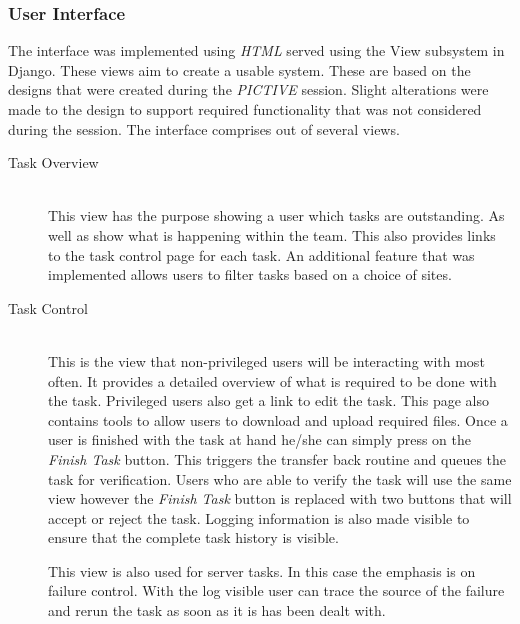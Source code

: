 \documentclass[12pt,a4paper]{report}
\begin{document}
\subsubsection{User Interface}
The interface was implemented using \emph{HTML} served using the View subsystem in Django.
These views aim to create a usable system. These are based on the designs that were created
during the \emph{PICTIVE} session. Slight alterations were made to the design to support required
functionality that was not considered during the session. The interface comprises out of several
views.
\begin{description}
\item[Task Overview] \hfill \\
    This view has the purpose showing a user which tasks are outstanding. As well as show what is
    happening within the team. This also provides links to the task control page for each task.
    An additional feature that was implemented allows users to filter tasks based on a choice
    of sites.
\item[Task Control] \hfill \\
    This is the view that non-privileged users will be interacting with most often. It provides
    a detailed overview of what is required to be done with the task. Privileged users also
    get a link to edit the task. This page also contains tools to allow users to download
    and upload required files. Once a user is finished with the task at hand he/she can
    simply press on the \emph{Finish Task} button. This triggers the transfer back routine
    and queues the task for verification. Users who are able to verify the task will use the
    same view however the \emph{Finish Task} button is replaced with two buttons that will
    accept or reject the task. Logging information is also made visible to ensure that the
    complete task history is visible.

    This view is also used for server tasks. In this case the emphasis is on failure control.
    With the log visible user can trace the source of the failure and rerun the task as soon
    as it is has been dealt with.


\end{description}
\end{document}
